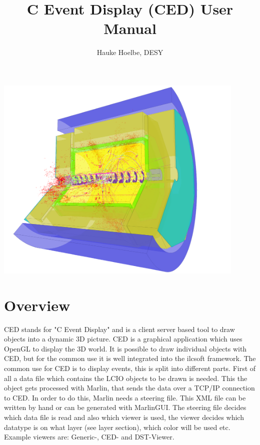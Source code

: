 \documentclass[a4paper,10pt]{article}
\title{C Event Display (CED) User Manual}
\author{Hauke Hoelbe, DESY}
\begin{document}
\maketitle
\bigskip
\bigskip
\bigskip
\bigskip
\bigskip
\bigskip


\begin{center}
 \includegraphics[width=12cm]{title3b.png}
\end{center}
\newpage

\tableofcontents
\newpage
\section{Overview}
CED stands for "C Event Display" and is a client server based tool to draw objects into a dynamic 3D picture. CED is a graphical application which uses OpenGL to display the 3D world. It is possible to draw individual objects with CED, but for the common use it is well integrated into the ilcsoft framework.
\newline\newline
The common use for CED is to display events, this is split into different parts. First of all a data file which contains the LCIO objects to be drawn is needed. This the object gets processed with Marlin, that sends the data over a TCP/IP connection to CED. In order to do this, Marlin needs a steering file. This XML file can be written by hand or can be generated with MarlinGUI.
\newline\newline
The steering file decides which data file is read and also which viewer is used, the viewer decides which datatype is on what layer (see layer section), which color will be used etc. Example viewers are: Generic-, CED- and DST-Viewer.
\end{document}
